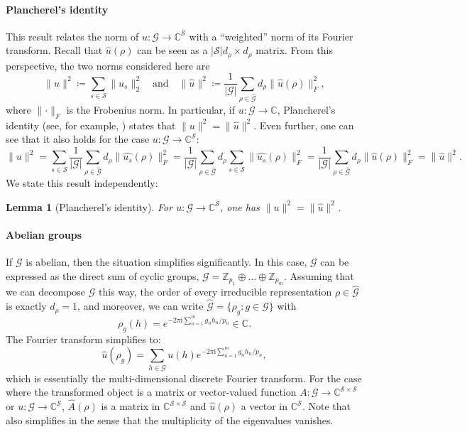 \documentclass[preprint,12pt,authoryear]{elsarticle}
\newcommand{\Z}{\mathbb Z}
\newcommand{\C}{\mathbb{C}}
\newcommand{\Fourier}[1]{\widehat{#1}}
\newcommand\Gc{\mathcal G}
\newcommand\Sc{\mathcal S}
\newtheorem{lemma}{Lemma}%
\begin{document}
{\paragraph{Plancherel's identity} 
This result relates the norm of $u : \Gc \rightarrow \C^\Sc$ with a ``weighted'' norm of its Fourier transform.  Recall that $\Fourier{u}(\rho)$ can be seen as a $|\Sc|d_\rho \times d_\rho$ matrix. From this perspective, the two norms considered here are %
$$
    \lVert u \rVert^2 \coloneqq \sum_{s \in \Sc} \lVert u_s \rVert^2_2
    \quad\text{and}\quad 
    \lVert \Fourier{u} \rVert^2 \coloneqq \frac{1}{|\Gc|} \sum_{\rho \in \Fourier{\Gc}} d_\rho \lVert \Fourier{u}(\rho) \rVert_F^2,
$$
where $\lVert \cdot \rVert_F$ is the Frobenius norm. In particular, if $u : \Gc \rightarrow \C$, Plancherel's identity (see, for example, \cite[Theorem 2, p. 258, exercise on p. 263]{terras1999fourier}) states that 
$
    \lVert u \rVert^2 = \lVert \Fourier{u} \rVert^2.
$
Even further, one can see that it also holds for the case $u : \Gc \rightarrow \C^\Sc$:
$$
    \lVert u \rVert^2 
    = \sum_{s \in \Sc} \frac 1 {|\Gc|} \sum_{\rho \in \Fourier{\Gc}} d_\rho \lVert \Fourier{u_s}(\rho) \rVert^2_F 
    = \frac 1 {|\Gc|} \sum_{\rho \in \Fourier{\Gc}} d_\rho \sum_{s \in \Sc} \lVert \Fourier{u_s}(\rho) \rVert^2_F 
    = \frac 1 {|\Gc|} \sum_{\rho \in \Fourier{\Gc}} d_\rho \lVert \Fourier{u}(\rho) \rVert^2_F = \lVert \Fourier{u} \rVert^2.
$$
We state this result independently:
\begin{lemma}[Plancherel's identity]
    For $u : \Gc \rightarrow \C^\Sc$, one has $\lVert u \rVert^2 = \lVert \Fourier{u} \rVert^2$.
    \label{thr:plancherel}
\end{lemma}

\paragraph{Abelian groups}
If $\Gc$ is abelian, then the situation simplifies significantly. In this case, $\Gc$ can be expressed as the direct sum of cyclic groups, $\Gc = \Z_{p_1} \oplus \dots \oplus \Z_{p_m}$. %
Assuming that we can decompose $\Gc$ this way, %
the order of every irreducible representation $\rho \in \Fourier{\Gc}$ is exactly $d_\rho = 1$, and moreover, we can write $\Fourier{\Gc} = \{ \rho_g : g \in \Gc \}$ with
$$
    \rho_g(h) = e^{-2\pi \mathrm i \sum_{n=1}^m g_n h_n / p_n } \in \C.
$$
The Fourier transform simplifies to:
$$
    \Fourier{u}(\rho_g) = \sum_{h \in \Gc} u(h) e^{-2 \pi \mathrm i \sum_{n=1}^m g_n h_n / p_n},
$$
which is essentially the multi-dimensional discrete Fourier transform. For the case where the transformed object is a matrix or vector-valued function $A : \Gc \rightarrow \C^{\Sc \times \Sc}$ or $u : \Gc \rightarrow \C^{\Sc}$, $\Fourier{A}(\rho)$ is a matrix in $\C^{\Sc \times \Sc}$ and $\Fourier{u}(\rho)$ a vector in $\C^\Sc$. 
Note that  also simplifies in the sense that the multiplicity of the eigenvalues vanishes.

}
\end{document}
